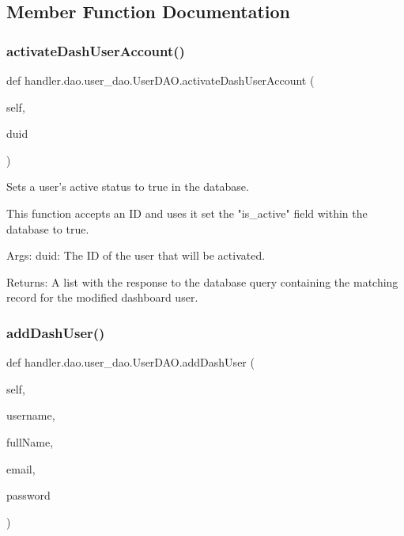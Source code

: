 \subsection{Member Function Documentation}
\mbox{\label{classhandler_1_1dao_1_1user__dao_1_1_user_d_a_o_aa2dafcbc31416860bc4b64c2332c0f5c}} 
\subsubsection{\texorpdfstring{activate\+Dash\+User\+Account()}{activateDashUserAccount()}}
{\footnotesize\ttfamily def handler.\+dao.\+user\+\_\+dao.\+User\+D\+A\+O.\+activate\+Dash\+User\+Account (\begin{DoxyParamCaption}\item[{}]{self,  }\item[{}]{duid }\end{DoxyParamCaption})}

\begin{DoxyVerb}Sets a user's active status to true in the database.

This function accepts an ID and uses it set the "is_active" field
within the database to true.

Args:
    duid: The ID of the user that will be activated.

Returns:
    A list with the response to the database query
    containing the matching record for the modified dashboard user.
\end{DoxyVerb}
 \mbox{\label{classhandler_1_1dao_1_1user__dao_1_1_user_d_a_o_a6e3f0dfc7e16a8ec2313502ca0298397}} 
\subsubsection{\texorpdfstring{add\+Dash\+User()}{addDashUser()}}
{\footnotesize\ttfamily def handler.\+dao.\+user\+\_\+dao.\+User\+D\+A\+O.\+add\+Dash\+User (\begin{DoxyParamCaption}\item[{}]{self,  }\item[{}]{username,  }\item[{}]{full\+Name,  }\item[{}]{email,  }\item[{}]{password }\end{DoxyParamCaption})}

